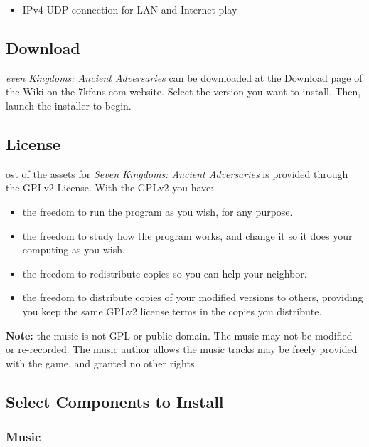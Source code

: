 
\begin{itemize}
	\item IPv4 UDP connection for LAN and Internet play
\end{itemize}

\subsection{Download}

\textit{even Kingdoms: Ancient Adversaries} can be downloaded at the Download page of the Wiki on the 7kfans.com website. Select the version you want to install. Then, launch the installer to begin.

\subsection{License}

ost of the assets for \textit{Seven Kingdoms: Ancient Adversaries} is provided through the GPLv2 License. With the GPLv2 you have: 

\begin{itemize}
	\item the freedom to run the program as you wish, for any purpose.
	\item the freedom to study how the program works, and change it so it does your computing as you wish. 
	\item the freedom to redistribute copies so you can help your neighbor.
	\item the freedom to distribute copies of your modified versions to others, providing you keep the same GPLv2 license terms in the copies you distribute.
\end{itemize}

\textbf{Note:} the music is not GPL or public domain. The music may not be modified or re-recorded. The music author allows the music tracks may be freely provided with the game, and granted no other rights.

\subsection{Select Components to Install}

\subsubsection{Music}

